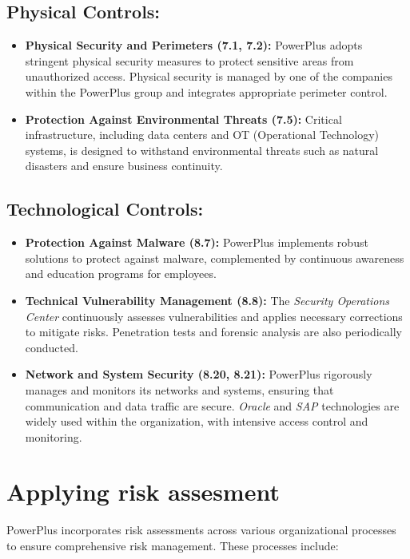 \subsection*{Physical Controls:}

\begin{itemize}
    \item \textbf{Physical Security and Perimeters (7.1, 7.2):} PowerPlus adopts stringent physical security measures to protect sensitive areas from unauthorized access. Physical security is managed by one of the companies within the PowerPlus group and integrates appropriate perimeter control.
    \item \textbf{Protection Against Environmental Threats (7.5):} Critical infrastructure, including data centers and OT (Operational Technology) systems, is designed to withstand environmental threats such as natural disasters and ensure business continuity.
\end{itemize}

\subsection*{Technological Controls:}

\begin{itemize}
    \item \textbf{Protection Against Malware (8.7):} PowerPlus implements robust solutions to protect against malware, complemented by continuous awareness and education programs for employees.
    \item \textbf{Technical Vulnerability Management (8.8):} The \textit{Security Operations Center} continuously assesses vulnerabilities and applies necessary corrections to mitigate risks. Penetration tests and forensic analysis are also periodically conducted.
    \item \textbf{Network and System Security (8.20, 8.21):} PowerPlus rigorously manages and monitors its networks and systems, ensuring that communication and data traffic are secure. \textit{Oracle} and \textit{SAP} technologies are widely used within the organization, with intensive access control and monitoring.
\end{itemize}




\section{Applying risk assesment}

PowerPlus incorporates risk assessments across various organizational processes to ensure comprehensive risk management. These processes include:

